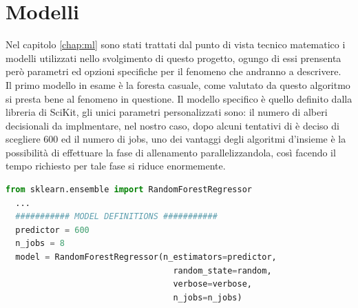 \documentclass[%
    corpo=12pt,
    twoside,
    oldstyle,
    autoretitolo,
    greek,
    evenboxes,
]{toptesi}
\begin{document}
\section{Modelli}
Nel capitolo \ref{chap:ml} sono stati trattati dal punto di vista tecnico matematico i modelli utilizzati nello svolgimento di questo progetto, ogungo di essi prensenta però parametri ed opzioni specifiche per il fenomeno che andranno a descrivere.\\
Il primo modello in esame è la foresta casuale, come valutato da \cite{santosh_se} \cite{Chen} \cite{super_unsuper} questo algoritmo si presta bene al fenomeno in questione. Il modello specifico è quello definito dalla libreria di SciKit, gli unici parametri personalizzati sono: il numero di alberi decisionali da implmentare, nel nostro caso, dopo alcuni tentativi di è deciso di scegliere 600 ed il numero di jobs, uno dei vantaggi degli algoritmi d'insieme è la possibilità di effettuare la fase di allenamento parallelizzandola, così facendo il tempo richiesto per tale fase si riduce enormemente.
\begin{lstlisting}[language=Python, frame=single, basicstyle=\small]
  from sklearn.ensemble import RandomForestRegressor
  ...
  ########### MODEL DEFINITIONS ###########
  predictor = 600
  n_jobs = 8
  model = RandomForestRegressor(n_estimators=predictor, 
                                  random_state=random, 
                                  verbose=verbose, 
                                  n_jobs=n_jobs)
\end{lstlisting}
\end{document}
